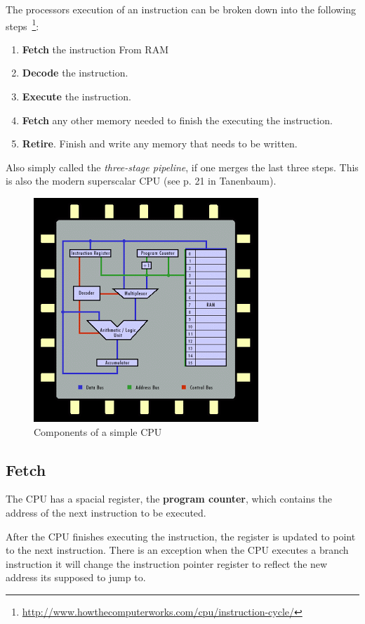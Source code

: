 
The processors execution of an instruction can be broken down into the following steps~\footnote{\url{http://www.howthecomputerworks.com/cpu/instruction-cycle/}}:
\begin{enumerate}
\item \textbf{Fetch} the instruction From RAM
\item \textbf{Decode} the instruction.
\item \textbf{Execute} the instruction.
\item \textbf{Fetch} any other memory needed to finish the executing the instruction.
\item \textbf{Retire}. Finish and write any memory that needs to be written.
\end{enumerate}

Also simply called the \emph{three-stage pipeline}, if one merges the last three steps. This is also the modern superscalar CPU (see p. 21 in Tanenbaum).

\begin{figure}[H]
  \centering
  \includegraphics[scale=0.5]{images/cpu}
  \caption{Components of a simple CPU}
\end{figure}

\subsection{Fetch}
The CPU has a spacial register, the \textbf{program counter}, which contains the address of the next instruction to be executed.

After the CPU finishes executing the instruction, the register is updated to point to the next instruction. There is an exception when the CPU executes a branch instruction it will change the instruction pointer register to reflect the new address its supposed to jump to.

